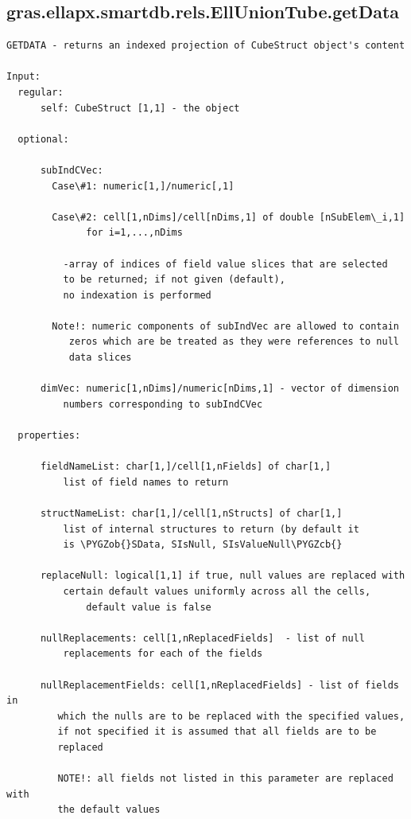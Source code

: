 \documentclass[letterpaper,10pt,english]{sphinxmanual}
\def\PYGZob{\char`\{}
\def\PYGZcb{\char`\}}
\begin{document}
\subsection{gras.ellapx.smartdb.rels.EllUnionTube.getData}
\label{chap_functions:gras-ellapx-smartdb-rels-elluniontube-getdata}
\begin{Verbatim}[commandchars=\\\{\}]
GETDATA - returns an indexed projection of CubeStruct object's content

Input:
  regular:
      self: CubeStruct [1,1] - the object

  optional:

      subIndCVec:
        Case\#1: numeric[1,]/numeric[,1]

        Case\#2: cell[1,nDims]/cell[nDims,1] of double [nSubElem\_i,1]
              for i=1,...,nDims

          -array of indices of field value slices that are selected
          to be returned; if not given (default),
          no indexation is performed

        Note!: numeric components of subIndVec are allowed to contain
           zeros which are be treated as they were references to null
           data slices

      dimVec: numeric[1,nDims]/numeric[nDims,1] - vector of dimension
          numbers corresponding to subIndCVec

  properties:

      fieldNameList: char[1,]/cell[1,nFields] of char[1,]
          list of field names to return

      structNameList: char[1,]/cell[1,nStructs] of char[1,]
          list of internal structures to return (by default it
          is \PYGZob{}SData, SIsNull, SIsValueNull\PYGZcb{}

      replaceNull: logical[1,1] if true, null values are replaced with
          certain default values uniformly across all the cells,
              default value is false

      nullReplacements: cell[1,nReplacedFields]  - list of null
          replacements for each of the fields

      nullReplacementFields: cell[1,nReplacedFields] - list of fields in
         which the nulls are to be replaced with the specified values,
         if not specified it is assumed that all fields are to be
         replaced

         NOTE!: all fields not listed in this parameter are replaced with
         the default values


\end{Verbatim}
\end{document}

